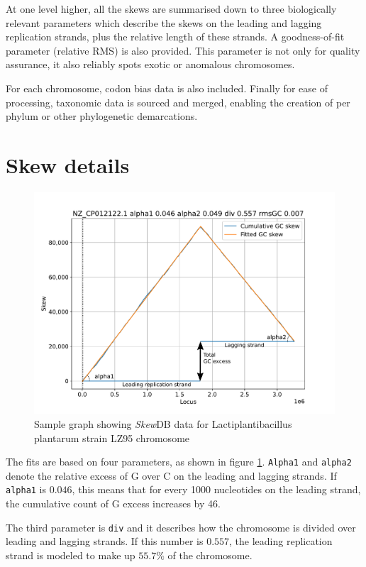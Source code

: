 \documentclass[9pt,twocolumn,twoside]{pnas-new}
\begin{document}
At one level higher, all the skews are summarised down to three biologically relevant parameters which describe the skews on the leading and lagging replication strands, plus the relative length of these strands. A goodness-of-fit parameter (relative RMS) is also provided. This parameter is not only for quality assurance, it also reliably spots exotic or anomalous chromosomes.

For each chromosome, codon bias data is also included. Finally for ease of processing, taxonomic data is sourced and merged, enabling the creation of per phylum or other phylogenetic demarcations. 

\section*{Skew details}

\begin{figure}[ht]
\centering
\includegraphics[width=.9\linewidth]{explainer.pdf}
\caption{Sample graph showing \emph{Skew}DB data for Lactiplantibacillus plantarum strain LZ95 chromosome}
\label{fig:explainer-graph}
\end{figure}

The fits are based on four parameters, as shown in figure \ref{fig:explainer-graph}. {\tt Alpha1} and {\tt alpha2} denote the relative excess of G over C on the leading and lagging strands. If {\tt alpha1} is $0.046$, this means that for every 1000 nucleotides on the leading strand, the cumulative count of G excess increases by 46.

The third parameter is {\tt div} and it describes how the chromosome is divided over leading and lagging strands. If this number is $0.557$, the leading replication strand is modeled to make up $55.7\%$ of the chromosome.
\end{document}
